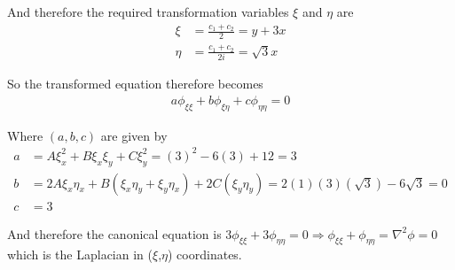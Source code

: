 \begin{enumerate}[label=(\roman*),leftmargin=*,itemsep=0mm]
    And therefore the required transformation variables $\xi$ and $\eta$ are
    \begin{align*}
        \xi  &= \frac{c_1+c_2}{2} = y + 3x \\
        \eta &= \frac{c_1+c_2}{2i} = \sqrt{3}x
    \end{align*}
    
    So the transformed equation therefore becomes
    \begin{align*}
        a\phi_{\xi\xi} + b\phi_{\xi\eta} + c\phi_{\eta\eta} = 0
    \end{align*}
    
    Where $(a,b,c)$ are given by
    \begin{align*}
        a &= A\xi_x^2 + B\xi_x\xi_y + C\xi_y^2
        = (3)^2 - 6(3) + 12 = 3 \\
        b &= 2A\xi_x\eta_x + B(\xi_x\eta_y + \xi_y\eta_x) + 2C(\xi_y\eta_y) = 2(1)(3)(\sqrt{3}) - 6\sqrt{3} = 0 \\
        c &= 3
    \end{align*}
    
    And therefore the canonical equation is $3\phi_{\xi\xi} + 3\phi_{\eta\eta} = 0 \Rightarrow \phi_{\xi\xi} + \phi_{\eta\eta} = \nabla^2\phi =  0$ which is the Laplacian in ($\xi$,$\eta$) coordinates.
    
\end{enumerate}